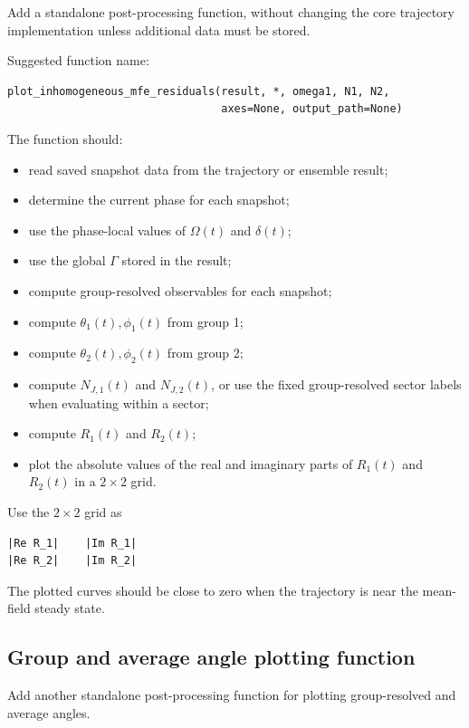 \documentclass[11pt]{article}
\begin{document}
Add a standalone post-processing function, without changing the core trajectory
implementation unless additional data must be stored.

Suggested function name:

\begin{verbatim}
plot_inhomogeneous_mfe_residuals(result, *, omega1, N1, N2,
                                 axes=None, output_path=None)
\end{verbatim}

The function should:

\begin{itemize}
\item read saved snapshot data from the trajectory or ensemble result;
\item determine the current phase for each snapshot;
\item use the phase-local values of \(\Omega(t)\) and \(\delta(t)\);
\item use the global \(\Gamma\) stored in the result;
\item compute group-resolved observables for each snapshot;
\item compute \(\theta_1(t),\phi_1(t)\) from group 1;
\item compute \(\theta_2(t),\phi_2(t)\) from group 2;
\item compute \(N_{J,1}(t)\) and \(N_{J,2}(t)\), or use the fixed
  group-resolved sector labels when evaluating within a sector;
\item compute \(R_1(t)\) and \(R_2(t)\);
\item plot the absolute values of the real and imaginary parts of \(R_1(t)\) and
  \(R_2(t)\) in a \(2\times2\) grid.
\end{itemize}

Use the \(2\times2\) grid as

\begin{verbatim}
|Re R_1|    |Im R_1|
|Re R_2|    |Im R_2|
\end{verbatim}

The plotted curves should be close to zero when the trajectory is near the
mean-field steady state.

\subsection*{Group and average angle plotting function}

Add another standalone post-processing function for plotting group-resolved and
average angles.
\end{document}
